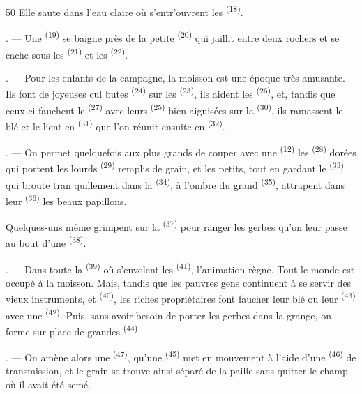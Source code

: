 \begin{VUpage}[52]{50}
\VUcontinue
Elle saute dans l'eau claire où s'entr'ouvrent les\nl
{} \textsuperscript{(18)}.

. --- Une  \textsuperscript{(19)} se baigne près de la\nl
petite  \textsuperscript{(20)} qui jaillit entre deux rochers et se\nl
cache sous les  \textsuperscript{(21)} et les \nl
{} \textsuperscript{(22)}.

. --- Pour les enfants de la campagne, la moisson\nl
est une époque très amusante. Ils font de joyeuses cul\cc
butes \textsuperscript{(24)} sur les  \textsuperscript{(23)}, ils aident les\nl
{} \textsuperscript{(26)}, et, tandis que ceux-ci fauchent\nl
le  \textsuperscript{(27)} avec leurs  \textsuperscript{(25)} bien aiguisées\nl
sur la  \textsuperscript{(30)}, ils ramassent le blé et le lient en\nl
{} \textsuperscript{(31)} que l'on réunit ensuite en  \textsuperscript{(32)}.

. --- On permet quelquefois aux plus grands de\nl
couper avec une  \textsuperscript{(12)} les  \textsuperscript{(28)} dorées qui\nl
portent les lourds  \textsuperscript{(29)} remplis de grain, et les\nl
petits, tout en gardant le  \textsuperscript{(33)} qui broute tran\cc
quillement dans la  \textsuperscript{(34)}, à l'ombre du grand\nl
{} \textsuperscript{(35)}, attrapent dans leur  \textsuperscript{(36)} les beaux\nl
papillons.

\VUblancAlinea
Quelques-uns même grimpent sur la  \textsuperscript{(37)}\nl
pour ranger les gerbes qu'on leur passe au bout d'une\nl
{} \textsuperscript{(38)}.

. --- Dans toute la  \textsuperscript{(39)} où s'envolent les\nl
{} \textsuperscript{(41)}, l'animation règne. Tout le monde est\nl
occupé à la moisson. Mais, tandis que les pauvres\nl
gens continuent à se servir des vieux instruments,\nl
{}  et  \textsuperscript{(40)}, les riches propriétaires\nl
font faucher leur blé ou leur  \textsuperscript{(43)} avec une\nl
{} \textsuperscript{(42)}. Puis, sans avoir\nl
besoin de porter les gerbes dans la grange, on forme\nl
sur place de grandes  \textsuperscript{(44)}.

. --- On amène alors une  \textsuperscript{(47)},\nl
qu'une  \textsuperscript{(45)} met en mouvement à l'aide\nl
d'une  \textsuperscript{(46)} de transmission, et le grain se\nl
trouve ainsi séparé de la paille sans quitter le champ\nl
où il avait été semé.
\end{VUpage}

